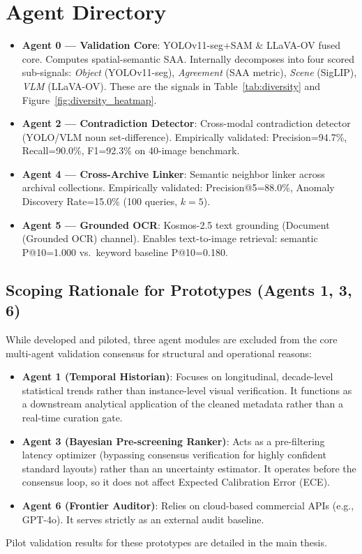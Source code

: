\documentclass[11pt,a4paper]{article}
\newcommand{\term}[1]{\textbf{#1}}
\begin{document}
\section{Agent Directory}\label{sec:agent_directory}
\begin{itemize}[leftmargin=*, noitemsep]
    \item \term{Agent 0 — Validation Core}: YOLOv11-seg+SAM \& LLaVA-OV fused core. Computes spatial-semantic SAA. Internally decomposes into four scored sub-signals: \textit{Object} (YOLOv11-seg), \textit{Agreement} (SAA metric), \textit{Scene} (SigLIP), \textit{VLM} (LLaVA-OV). These are the signals in Table~\ref{tab:diversity} and Figure~\ref{fig:diversity_heatmap}.
    \item \term{Agent 2 — Contradiction Detector}: Cross-modal contradiction detector (YOLO/VLM noun set-difference). Empirically validated: Precision=94.7\%, Recall=90.0\%, F1=92.3\% on 40-image benchmark.
    \item \term{Agent 4 — Cross-Archive Linker}: Semantic neighbor linker across archival collections. Empirically validated: Precision@5=88.0\%, Anomaly Discovery Rate=15.0\% (100 queries, $k=5$).
    \item \term{Agent 5 — Grounded OCR}: Kosmos-2.5 text grounding (Document (Grounded OCR) channel). Enables text-to-image retrieval: semantic P@10=1.000 vs.~keyword baseline P@10=0.180.
\end{itemize}
\subsection*{Scoping Rationale for Prototypes (Agents 1, 3, 6)}
While developed and piloted, three agent modules are excluded from the core multi-agent validation consensus for structural and operational reasons:
\begin{itemize}[leftmargin=*, noitemsep]
    \item \term{Agent 1 (Temporal Historian)}: Focuses on longitudinal, decade-level statistical trends rather than instance-level visual verification. It functions as a downstream analytical application of the cleaned metadata rather than a real-time curation gate.
    \item \term{Agent 3 (Bayesian Pre-screening Ranker)}: Acts as a pre-filtering latency optimizer (bypassing consensus verification for highly confident standard layouts) rather than an uncertainty estimator. It operates before the consensus loop, so it does not affect Expected Calibration Error (ECE).
    \item \term{Agent 6 (Frontier Auditor)}: Relies on cloud-based commercial APIs (e.g., GPT-4o). It serves strictly as an external audit baseline.
\end{itemize}
Pilot validation results for these prototypes are detailed in the main thesis.
\end{document}
